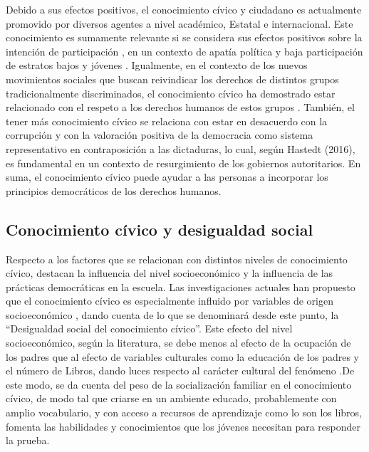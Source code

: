 \documentclass[12pt,twoside]{templates/facsothesis}
\begin{document}
Debido a sus efectos positivos, el conocimiento cívico y ciudadano es actualmente promovido por diversos agentes a nivel académico, Estatal e internacional. Este conocimiento es sumamente relevante si se considera sus efectos positivos sobre la intención de participación \citep{miranda_Desigualdad_2015}, en un contexto de apatía política y baja participación de estratos bajos y jóvenes \citep{janmaat_Civic_2013, contreras_DIFERENCIAS_2013}. Igualmente, en el contexto de los nuevos movimientos sociales que buscan reivindicar los derechos de distintos grupos tradicionalmente discriminados, el conocimiento cívico ha demostrado estar relacionado con el respeto a los derechos humanos de estos grupos \citep{miranda_Political_2018, caro_Ten_2012}. También, el tener más conocimiento cívico se relaciona con estar en desacuerdo con la corrupción y con la valoración positiva de la democracia como sistema representativo en contraposición a las dictaduras, lo cual, según Hastedt (2016), es fundamental en un contexto de resurgimiento de los gobiernos autoritarios. En suma, el conocimiento cívico puede ayudar a las personas a incorporar los principios democráticos de los derechos humanos.

\hypertarget{conocimiento-cuxedvico-y-desigualdad-social}{%
\subsection{Conocimiento cívico y desigualdad social}\label{conocimiento-cuxedvico-y-desigualdad-social}}

Respecto a los factores que se relacionan con distintos niveles de conocimiento cívico, destacan la influencia del nivel socioeconómico y la influencia de las prácticas democráticas en la escuela. Las investigaciones actuales han propuesto que el conocimiento cívico es especialmente influido por variables de origen socioeconómico \citep{ace_Estudio_2017, schulz_Estudio_2011, ferrans_Civic_2017, trevino_Influence_2017}, dando cuenta de lo que se denominará desde este punto, la ``Desigualdad social del conocimiento cívico''. Este efecto del nivel socioeconómico, según la literatura, se debe menos al efecto de la ocupación de los padres que al efecto de variables culturales como la educación de los padres y el número de Libros, dando luces respecto al carácter cultural del fenómeno \citep{castillo_Social_2014}.De este modo, se da cuenta del peso de la socialización familiar en el conocimiento cívico, de modo tal que criarse en un ambiente educado, probablemente con amplio vocabulario, y con acceso a recursos de aprendizaje como lo son los libros, fomenta las habilidades y conocimientos que los jóvenes necesitan para responder la prueba.
\end{document}
